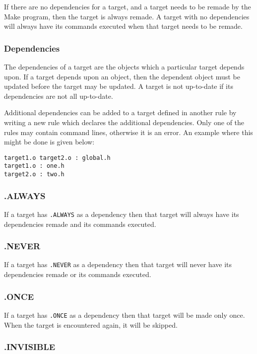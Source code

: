 If there are no dependencies for a target, and a target needs to be remade
by the Make program, then the target is always remade.  A target with no
dependencies will always have its commands executed when that target needs
to be remade.

\subsubsection{Dependencies}

The dependencies of a target are the objects which a particular target
depends upon.  If a target depends upon an object, then the dependent
object must be updated before the target may be updated.  A target is not
up-to-date if its dependencies are not all up-to-date.

Additional dependencies can be added to a target defined in another rule by
writing a new rule which declares the additional dependencies.  Only one of
the rules may contain command lines, otherwise it is an error.  An example
where this might be done is given below:

\begin{verbatim}
target1.o target2.o : global.h
target1.o : one.h
target2.o : two.h
\end{verbatim}

\subsubsection{.ALWAYS}

If a target has {\tt .ALWAYS} as a dependency then that target will always
have its dependencies remade and its commands executed.

\subsubsection{.NEVER}

If a target has {\tt .NEVER} as a dependency then that target will never
have its dependencies remade or its commands executed.

\subsubsection{.ONCE}

If a target has {\tt .ONCE} as a dependency then that target will be
made only once.  When the target is encountered again, it will be skipped.

\subsubsection{.INVISIBLE}

